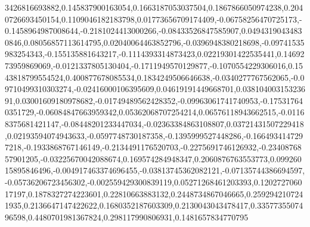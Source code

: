3426816693882,0.145837900163054,0.1663187053037504,0.1867866050974238,0.2040726693450154,0.1109046182183798,0.01773656709174409,-0.06758256470725173,-0.1458964987008644,-0.2181024413000266,-0.08433526847585907,0.04943190434830846,0.08056857113614795,0.02040064463852796,-0.0396948380218698,-0.09741535983254343,-0.155135881643217,-0.1114393314873423,0.02219301422535441,0.1469273959869069,-0.0121337805130404,-0.1711949570129877,-0.1070554229306016,0.1543818799554524,0.400877678085534,0.1834249506646638,-0.0340277767562065,-0.09710499310303274,-0.02416000106395609,0.04619191449668701,0.03810400315323691,0.03001609180978682,-0.01749489562428352,-0.09963061741740953,-0.175317640351729,-0.06084847663959342,0.05362068707254214,0.06576118943662515,-0.01168375681421147,-0.08448201233447034,-0.02363384863108807,0.03721431507229418,0.02193594074943633,-0.0597748730187358,-0.1395999527448286,-0.1664934147297218,-0.1933868767146149,-0.2134491176520703,-0.2275691746126932,-0.2340876857901205,-0.03225670042088674,0.169574284948347,0.2060876763553773,0.09926015895846496,-0.004917463374696455,-0.03813745362082121,-0.07135744386694597,-0.05736206723456302,-0.002559429300839119,0.05271268461203393,0.120272706017197,0.1878327274223601,0.22810663883132,0.2448734867046665,0.2592942107241935,0.2136647147422622,0.1680352187603309,0.2130043043478417,0.3357735507496598,0.4480701981367824,0.298117990806931,0.1481657834770795
